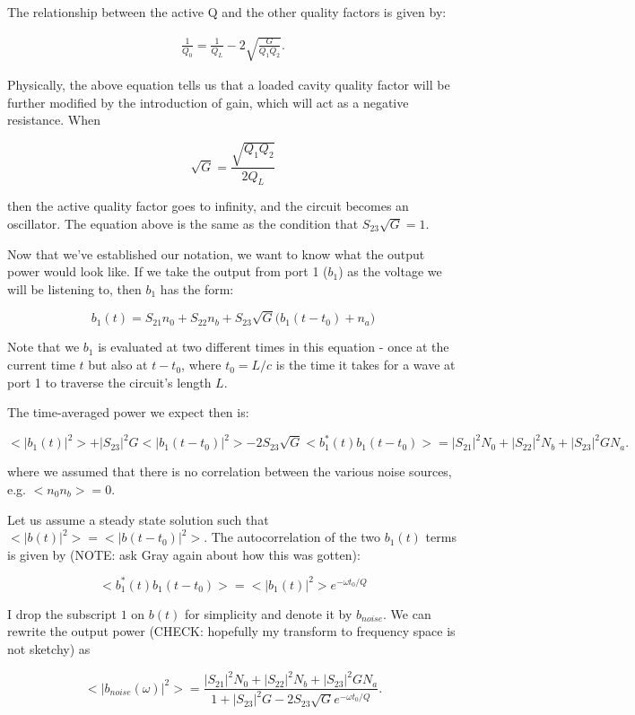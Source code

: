 \documentclass{article}
\begin{document}
The relationship between the active Q and the other quality factors is
given by:

\begin{align}
\frac{1}{Q_0} = \frac{1}{Q_L} - 2\sqrt{\frac{G}{Q_1 Q_2}}.
\end{align}

Physically, the above equation tells us that a loaded cavity quality
factor will be further modified by the introduction of gain, which will
act as a negative resistance. When

\[
\sqrt{G} = \frac{\sqrt{Q_1 Q_2}}{2 Q_L}
\]

then the active quality factor goes to infinity, and the circuit becomes
an oscillator. The equation above is the same as the condition that
\(S_{23}\sqrt{G} = 1\).

Now that we've established our notation, we want to know what the output
power would look like. If we take the output from port 1 (\(b_1\)) as
the voltage we will be listening to, then \(b_1\) has the form:

\[
b_1(t)= S_{21} n_0 + S_{22} n_b + S_{23} \sqrt{G} \big(b_1(t- t_0) + n_a \big)
\]

Note that we \(b_1\) is evaluated at two different times in this
equation - once at the current time \(t\) but also at \(t-t_0\), where
\(t_0 = L/c\) is the time it takes for a wave at port 1 to traverse the
circuit's length \(L\).

The time-averaged power we expect then is:

\[
<|b_1(t)|^2> + |S_{23}|^2 G <|b_1(t-t_0)|^2> - 2 S_{23} \sqrt{G} < b_1^*(t)b_1(t-t_0)> = |S_{21}|^2 N_0 + |S_{22}|^2 N_b + |S_{23}|^2 G N_a.
\]

where we assumed that there is no correlation between the various noise
sources, e.g. \(<n_0 n_b> = 0\).

Let us assume a steady state solution such that
\(<|b(t)|^2> = <|b(t-t_0)|^2>\). The autocorrelation of the two
\(b_1(t)\) terms is given by (NOTE: ask Gray again about how this was
gotten):

\[
<b_1^*(t)b_1(t-t_0)> = <|b_1(t)|^2> e^{-\omega t_0/Q}
\]

I drop the subscript \(1\) on \(b(t)\) for simplicity and denote it by
\(b_{noise}\). We can rewrite the output power (CHECK: hopefully my
transform to frequency space is not sketchy) as

\[
<|b_{noise}(\omega)|^2> = \frac{|S_{21}|^2 N_0 + |S_{22}|^2 N_b + |S_{23}|^2 G N_a}{1 + |S_{23}|^2 G - 2S_{23}\sqrt{G}e^{-\omega t_0/Q}}.
\]
\end{document}
